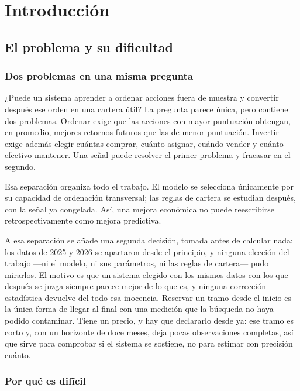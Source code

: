 \chapter{Introducción}
\label{chap:introduccion}

\section{El problema y su dificultad}

\subsection{Dos problemas en una misma pregunta}

¿Puede un sistema aprender a ordenar acciones fuera de muestra y convertir después ese orden en una
cartera útil? La pregunta parece única, pero contiene dos problemas. Ordenar exige que las acciones
con mayor puntuación obtengan, en promedio, mejores retornos futuros que las de menor puntuación.
Invertir exige además elegir cuántas comprar, cuánto asignar, cuándo vender y cuánto efectivo
mantener. Una señal puede resolver el primer problema y fracasar en el segundo.

Esa separación organiza todo el trabajo. El modelo se selecciona únicamente por su capacidad de
ordenación transversal; las reglas de cartera se estudian después, con la señal ya congelada. Así,
una mejora económica no puede reescribirse retrospectivamente como mejora predictiva.

A esa separación se añade una segunda decisión, tomada antes de calcular nada: los datos de 2025 y
2026 se apartaron desde el principio, y ninguna elección del trabajo ---ni el modelo, ni sus
parámetros, ni las reglas de cartera--- pudo mirarlos. El motivo es que un sistema elegido con los
mismos datos con los que después se juzga siempre parece mejor de lo que es, y ninguna corrección
estadística devuelve del todo esa inocencia. Reservar un tramo desde el inicio es la única forma de
llegar al final con una medición que la búsqueda no haya podido contaminar. Tiene un precio, y hay
que declararlo desde ya: ese tramo es corto y, con un horizonte de doce meses, deja pocas
observaciones completas, así que sirve para comprobar si el sistema se sostiene, no para estimar con
precisión cuánto.

\subsection{Por qué es difícil}

